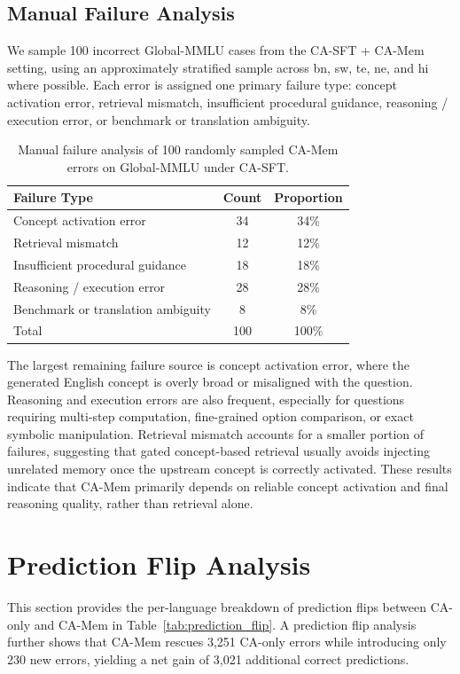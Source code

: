 \documentclass[11pt]{article}
\begin{document}
\subsection{Manual Failure Analysis}
We sample 100 incorrect Global-MMLU cases from the CA-SFT + CA-Mem setting, using an approximately stratified sample across bn, sw, te, ne, and hi where possible.
Each error is assigned one primary failure type: concept activation error, retrieval mismatch, insufficient procedural guidance, reasoning / execution error, or benchmark or translation ambiguity.

\begin{table}[!htbp]
\centering
\scriptsize
\setlength{\tabcolsep}{4pt}
\renewcommand{\arraystretch}{0.95}
\begin{tabular}{l c c}
\hline
Failure Type & Count & Proportion \\
\hline
Concept activation error & 34 & 34\% \\
Retrieval mismatch & 12 & 12\% \\
Insufficient procedural guidance & 18 & 18\% \\
Reasoning / execution error & 28 & 28\% \\
Benchmark or translation ambiguity & 8 & 8\% \\
Total & 100 & 100\% \\
\hline
\end{tabular}
\caption{Manual failure analysis of 100 randomly sampled CA-Mem errors on Global-MMLU under CA-SFT.}
\label{tab:manual_failure_analysis}
\end{table}

The largest remaining failure source is concept activation error, where the generated English concept is overly broad or misaligned with the question. Reasoning and execution errors are also frequent, especially for questions requiring multi-step computation, fine-grained option comparison, or exact symbolic manipulation. Retrieval mismatch accounts for a smaller portion of failures, suggesting that gated concept-based retrieval usually avoids injecting unrelated memory once the upstream concept is correctly activated. These results indicate that CA-Mem primarily depends on reliable concept activation and final reasoning quality, rather than retrieval alone.

\section{Prediction Flip Analysis}
\label{sec:app_prediction_flip}
\label{sec:appendix_flip}
This section provides the per-language breakdown of prediction flips between CA-only and CA-Mem in Table~\ref{tab:prediction_flip}.
A prediction flip analysis further shows that CA-Mem rescues 3,251 CA-only errors while introducing only 230 new errors, yielding a net gain of 3,021 additional correct predictions.
\end{document}
